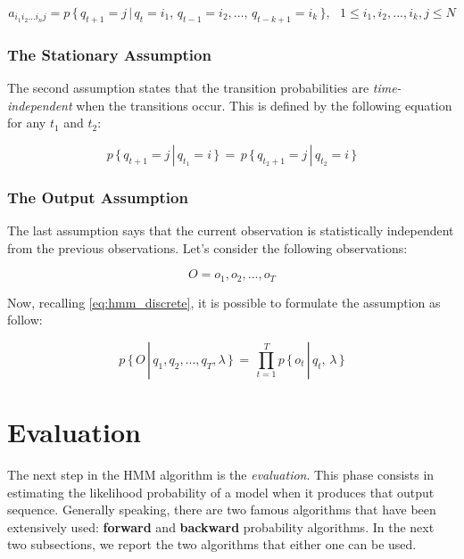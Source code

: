 \begin{equation}
\label{eq:transition_nth_order}
a_{i_{1}i_{2}...i_{n}j} = p\, \{\, q_{t+1} = j \,|\, q_{t} = i_{1}, \, q_{t-1} = i_{2}, ... , \, q_{t-k+1} = i_{k} \, \}, \,\,\,\, 1 \leq i_{1},i_{2}, ... ,i_{k}, j \leq N
\end{equation}


\subsubsection{The Stationary Assumption}
The second assumption states that the transition probabilities are \textit{time-independent} when the transitions occur. This is defined by the following equation for any $t_{1}$ and $t_{2}$:

\begin{equation}
	p \, \{\, q_{t+1} = j \,|\, q_{t_{1}} = i\, \}\, = \,p \,\{\, q_{t_{2}+1} = j \,|\, q_{t_{2}} = i\, \}
\end{equation}

\subsubsection{The Output Assumption}
The last assumption says that the current observation is statistically independent from the previous observations. Let's consider the following observations:

\begin{equation}
	O = o_{1}, o_{2}, ... , o_{T}
\end{equation}

Now, recalling \ref{eq:hmm_discrete}, it is possible to formulate the assumption as follow:

\begin{equation}
\label{eq:final_hmm}
	p \, \{\, O \, |\, q_{1},q_{2}, ... , q_{T}, \lambda \,\}\, = \, \prod_{t = 1}^{T} p \, \{ \, o_{t} \, | \, q_{t}, \, \lambda \,\}
\end{equation}

\section{Evaluation}
The next step in the HMM algorithm is the \textit{evaluation}. This phase consists in estimating the likelihood probability of a model when it produces that output sequence. Generally speaking, there are two famous algorithms that have been extensively used: \textbf{forward} and \textbf{backward} probability algorithms. In the next two subsections, we report the two algorithms that either one can be used.

